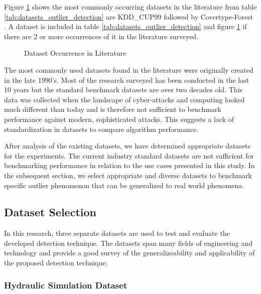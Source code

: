 

Figure \ref{fig_dataset_lit} shows the most commonly occurring datasets in the literature from table \ref{tab:datasets_outlier_detection} are KDD\_CUP99 \parencite{kdd1999} followed by Covertype-Forest \parencite{covertype-dataset}. A dataset is included in table \ref{tab:datasets_outlier_detection} and figure \ref{fig_dataset_lit} if there are 2 or more occurrences of it in the literature surveyed.

\begin{figure}[H]
    \caption{Dataset Occurrence in Literature }
    \label{fig_dataset_lit}
\end{figure}


The most commonly used datasets found in the literature were originally created in the late 1990's. Most of the research surveyed has been conducted in the last 10 years but the standard benchmark datasets are over two decades old. This data was collected when the landscape of cyber-attacks and computing looked much different than today and is therefore not sufficient to benchmark performance against modern, sophisticated attacks. This suggests a lack of standardization in datasets to compare algorithm performance.

After analysis of the existing datasets, we have determined appropriate datasets for the experiments. The current industry standard datasets are not sufficient for benchmarking performance in relation to the use cases presented in this study. In the subsequent section, we select appropriate and diverse datasets to benchmark specific outlier phenomenon that can be generalized to real world phenomena. 

\subsection{Dataset Selection}
\label{ref_datasets}

In this research, three separate datasets are used to test and evaluate the developed detection technique. The datasets span many fields of engineering and technology and provide a good survey of the generalizeability and applicability of the proposed detection technique.  

\subsubsection{Hydraulic Simulation Dataset}
\label{ref_hydraulic_dataset}

